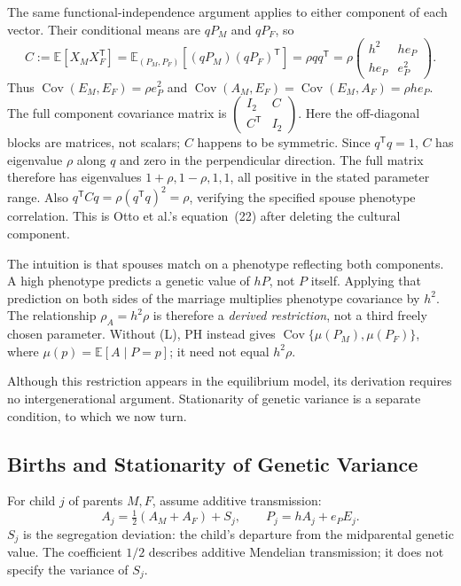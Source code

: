 The same functional-independence argument applies to either component
of each vector. Their conditional means are $qP_M$ and $qP_F$, so
\begin{equation}
 C:=\mathbb E[X_MX_F^{\mathsf T}]
 =\mathbb E_{(P_M,P_F)}[(qP_M)(qP_F)^{\mathsf T}]
 =\rho qq^{\mathsf T}
 =\rho\begin{pmatrix}h^2&h e_P\\h e_P&e_P^2\end{pmatrix}.
 \label{eq:ge-cross}
\end{equation}
Thus $\operatorname{Cov}(E_M,E_F)=\rho e_P^2$ and
$\operatorname{Cov}(A_M,E_F)=\operatorname{Cov}(E_M,A_F)=\rho h e_P$.
The full component covariance matrix is
$\left(\begin{smallmatrix}I_2&C\\C^{\mathsf T}&I_2\end{smallmatrix}\right)$.
Here the off-diagonal blocks are matrices, not scalars; $C$ happens to
be symmetric. Since $q^{\mathsf T}q=1$, $C$ has eigenvalue $\rho$ along $q$ and zero in the perpendicular direction. The full matrix therefore has eigenvalues
$1+\rho,1-\rho,1,1$, all positive in the stated parameter range.
Also $q^{\mathsf T}Cq=\rho(q^{\mathsf T}q)^2=\rho$, verifying the
specified spouse phenotype correlation. This is Otto et al.'s
equation~(22) after deleting the cultural component.

The intuition is that spouses match on a phenotype reflecting both
components. A high phenotype predicts a genetic value of $hP$, not
$P$ itself. Applying that prediction on both sides of the marriage
multiplies phenotype covariance by $h^2$. The relationship
$\rho_A=h^2\rho$ is therefore a \emph{derived restriction}, not a third
freely chosen parameter. Without (L), PH instead gives
$\operatorname{Cov}\{\mu(P_M),\mu(P_F)\}$, where
$\mu(p)=\mathbb E[A\mid P=p]$; it need not equal $h^2\rho$.

Although this restriction appears in the equilibrium model, its
derivation requires no intergenerational argument. Stationarity of
genetic variance is a separate condition, to which we now turn.

\subsection{Births and Stationarity of Genetic Variance}
\label{sec:model-transmission}

For child $j$ of parents $M,F$, assume additive transmission:
\begin{equation}
 A_j=\tfrac12(A_M+A_F)+S_j,\qquad P_j=hA_j+e_P E_j.
 \label{eq:model-transmission}
\end{equation}
$S_j$ is the segregation deviation: the child's departure from the
midparental genetic value. The coefficient $1/2$ describes additive
Mendelian transmission; it does not specify the variance of $S_j$.

